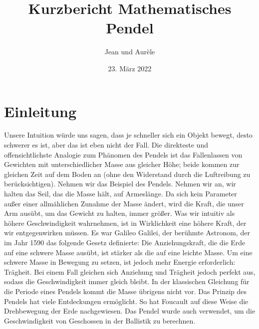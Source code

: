 \documentclass{report}
\title{Kurzbericht Mathematisches Pendel}
\author{Jean und Aurèle}
\date{23. März 2022}
\begin{document}
    \maketitle
    \section*{Einleitung}
    Unsere Intuition würde uns sagen, dass je schneller sich ein Objekt bewegt, desto schwerer es ist, aber das ist eben nicht der Fall.
    Die direkteste und offensichtlichste Analogie zum Phänomen des Pendels ist das Fallenlassen von Gewichten mit unterschiedlicher Masse
    aus gleicher Höhe; beide kommen zur gleichen Zeit auf dem Boden an (ohne den Widerstand durch die Luftreibung zu berücksichtigen). Nehmen
    wir das Beispiel des Pendels. Nehmen wir an, wir halten das Seil, das die Masse hält, auf Armeslänge. Da sich kein Parameter außer einer
    allmählichen Zunahme der Masse ändert, wird die Kraft, die unser Arm ausübt, um das Gewicht zu halten, immer größer.  Was wir intuitiv als
    höhere Geschwindigkeit wahrnehmen, ist in Wirklichkeit eine höhere Kraft, der wir entgegenwirken müssen. Es war Galileo Galilei, der berühmte
    Astronom, der im Jahr 1590 das folgende Gesetz definierte: Die Anziehungskraft, die die Erde auf eine schwere Masse ausübt, ist stärker als die
    auf eine leichte Masse. Um eine schwere Masse in Bewegung zu setzen, ist jedoch mehr Energie erforderlich: Trägheit. Bei einem Fall gleichen
    sich Anziehung und Trägheit jedoch perfekt aus, sodass die Geschwindigkeit immer gleich bleibt. In der klassischen Gleichung für die Periode
    eines Pendels kommt die Masse übrigens nicht vor. Das Prinzip des Pendels hat viele Entdeckungen ermöglicht. So hat Foucault auf diese Weise
    die Drehbewegung der Erde nachgewiesen. Das Pendel wurde auch verwendet, um die Geschwindigkeit von Geschossen in der Ballistik zu berechnen.
\end{document}
